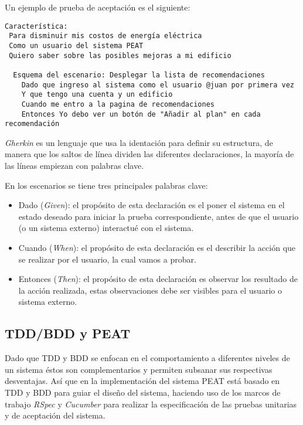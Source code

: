 \vspace{2.5mm}

Un ejemplo de prueba de aceptación es el siguiente:
\begin{lstlisting}
Característica:
 Para disminuir mis costos de energía eléctrica
 Como un usuario del sistema PEAT
 Quiero saber sobre las posibles mejoras a mi edificio

  Esquema del escenario: Desplegar la lista de recomendaciones
    Dado que ingreso al sistema como el usuario @juan por primera vez
    Y que tengo una cuenta y un edificio
    Cuando me entro a la pagina de recomendaciones
    Entonces Yo debo ver un botón de "Añadir al plan" en cada recomendación
\end{lstlisting}

\textit{Gherkin} es un lenguaje que usa la identación para definir su estructura,
de manera que los saltos de línea dividen las diferentes declaraciones,
la mayoría de las líneas empiezan con palabras clave.


\vspace{2.5mm}

En los escenarios se tiene tres principales palabras clave:
\begin{itemize}
\item Dado (\textit{Given}): el propósito de esta declaración es el poner
  el sistema en el estado deseado para iniciar la prueba correspondiente,
  antes de que el usuario (o un sistema externo) interactué con el sistema.
\item Cuando (\textit{When}): el propósito de esta declaración es el describir
  la acción que se realizar por el usuario, la cual vamos a probar.
\item Entonces (\textit{Then}): el propósito de esta declaración es observar
  los resultado de la acción realizada, estas observaciones debe ser visibles
  para el usuario o sistema externo.
\end{itemize}

\subsection{TDD/BDD y PEAT}
Dado que TDD y BDD se enfocan en el comportamiento a diferentes niveles
de un sistema éstos son complementarios y permiten subsanar sus respectivas
desventajas. Así que en la implementación del sistema PEAT está basado en
TDD y BDD para guiar el diseño del sistema, haciendo uso de los marcos
de trabajo \textit{RSpec} y \textit{Cucumber} para realizar la especificación
de las pruebas unitarias y de aceptación del sistema.

